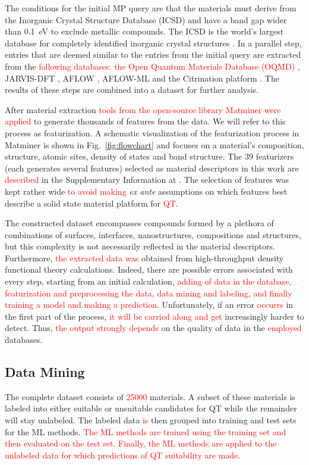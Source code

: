 \documentclass[superscriptaddress,unsortedaddress,
 amsmath,amssymb,
 aps,
]{revtex4-2}
\newcommand{\mrk}[1]{\textcolor{red}{#1}}
\begin{document}
The conditions for the initial MP query are that the materials must derive from the Inorganic Crystal Structure Database (ICSD) and have a band gap wider than \SI{0.1}{\electronvolt} to exclude metallic compounds.
The ICSD is the world's largest database for completely identified inorganic crystal structures  \cite{Allen1987,Zagorac2019}. In a parallel step, entries that are deemed similar to the entries from the initial query are extracted from the \mrk{following databases: the Open Quantum Materials Database (OQMD)}  \cite{Saal2013,Kirklin2015}, JARVIS-DFT \cite{Choudhary2020}, AFLOW \cite{Curtarolo2012, Curtarolo2012a, Calderon2015}, AFLOW-ML \cite{Isayev2017} and the Citrination platform \cite{OMaraJordan2016MDIA}. The results of these steps are combined into a dataset for further analysis. 

After material extraction \mrk{tools from the open-source library Matminer \cite{Ward2018} were applied} to generate thousands of features from the data. We will refer to this process as featurization. A schematic visualization of the featurization process in Matminer is shown in  Fig.~\ref{fig:flowchart} 
and focuses on a material's composition,  structure, atomic sites, density of states and band structure. 
The $39$ featurizers (each generates several features) selected as material descriptors in this work are \mrk{described} in the Supplementary Information at \cite{supplementary}. The selection of features was kept rather wide \mrk{to avoid making} {\em ex ante} assumptions on which features best describe a solid state material platform for \mrk{QT}. 

The constructed dataset encompasses compounds formed by a plethora of combinations of surfaces, interfaces, nanostructures, compositions and structures, but this complexity is not necessarily reflected in the material descriptors. 
Furthermore, \mrk{the extracted data was}  obtained from high-throughput density functional theory calculations. Indeed, there are possible errors associated with every step, starting from an initial calculation, \mrk{adding of data in the database, featurization and preprocessing the data, data mining and labeling, and finally training a model and making a prediction.}  Unfortunately, if an error \mrk{occurrs} in the first part of the process, \mrk{it will be  carried along and get} increasingly harder to detect. Thus, \mrk{the output strongly depends}  on the quality of data in the \mrk{employed} databases. 

\subsection*{Data Mining}
The complete dataset consists of \mrk{\num{25000}} materials. A subset of these materials is labeled into either suitable or unsuitable candidates for QT while the remainder will stay unlabeled. The labeled data \mrk{is} then grouped into training and test sets for the ML methods. \mrk{The ML methods are trained using the training set and then evaluated on the test set. Finally, the ML methods are applied to the unlabeled data for which predictions of QT suitability are made.}
\end{document}
